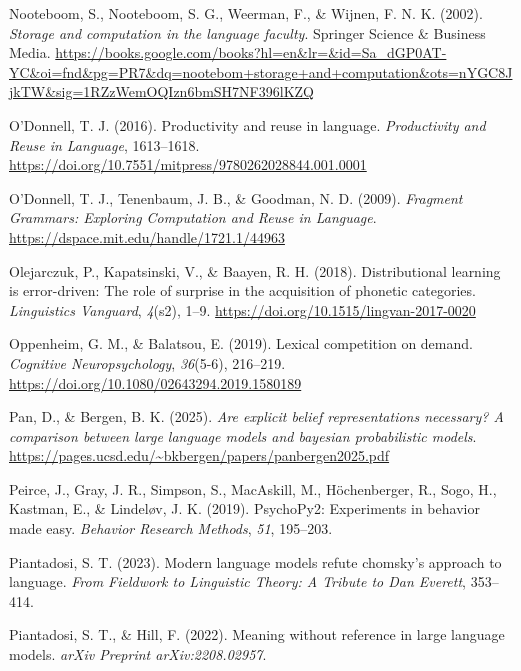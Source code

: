 \documentclass[
  12pt,
  letterpaper,
]{scrreprt}
\newlength{\cslhangindent}
\newenvironment{CSLReferences}[2] %
 {\begin{list}{}{%
  \setlength{\itemindent}{0pt}
  \setlength{\leftmargin}{0pt}
  \setlength{\parsep}{0pt}
  \ifodd #1
   \setlength{\leftmargin}{\cslhangindent}
   \setlength{\itemindent}{-1\cslhangindent}
  \fi
  \setlength{\itemsep}{#2\baselineskip}}}
 {\end{list}}
\begin{document}
\begin{CSLReferences}{1}{0}
Nooteboom, S., Nooteboom, S. G., Weerman, F., \& Wijnen, F. N. K.
(2002). \emph{Storage and computation in the language faculty}. Springer
Science \& Business Media.
\url{https://books.google.com/books?hl=en&lr=&id=Sa_dGP0AT-YC&oi=fnd&pg=PR7&dq=nootebom+storage+and+computation&ots=nYGC8JjkTW&sig=1RZzWemOQIzn6bmSH7NF396lKZQ}

O'Donnell, T. J. (2016). Productivity and reuse in language.
\emph{Productivity and Reuse in Language}, 1613--1618.
\url{https://doi.org/10.7551/mitpress/9780262028844.001.0001}

O'Donnell, T. J., Tenenbaum, J. B., \& Goodman, N. D. (2009).
\emph{Fragment Grammars: Exploring Computation and Reuse in Language}.
\url{https://dspace.mit.edu/handle/1721.1/44963}

Olejarczuk, P., Kapatsinski, V., \& Baayen, R. H. (2018). Distributional
learning is error-driven: The role of surprise in the acquisition of
phonetic categories. \emph{Linguistics Vanguard}, \emph{4}(s2), 1--9.
\url{https://doi.org/10.1515/lingvan-2017-0020}

Oppenheim, G. M., \& Balatsou, E. (2019). Lexical competition on demand.
\emph{Cognitive Neuropsychology}, \emph{36}(5-6), 216--219.
\url{https://doi.org/10.1080/02643294.2019.1580189}

Pan, D., \& Bergen, B. K. (2025). \emph{Are explicit belief
representations necessary? A comparison between large language models
and bayesian probabilistic models}.
\url{https://pages.ucsd.edu/~bkbergen/papers/panbergen2025.pdf}

Peirce, J., Gray, J. R., Simpson, S., MacAskill, M., Höchenberger, R.,
Sogo, H., Kastman, E., \& Lindeløv, J. K. (2019). PsychoPy2: Experiments
in behavior made easy. \emph{Behavior Research Methods}, \emph{51},
195--203.

Piantadosi, S. T. (2023). Modern language models refute chomsky's
approach to language. \emph{From Fieldwork to Linguistic Theory: A
Tribute to Dan Everett}, 353--414.

Piantadosi, S. T., \& Hill, F. (2022). Meaning without reference in
large language models. \emph{arXiv Preprint arXiv:2208.02957}.


\end{CSLReferences}
\end{document}
